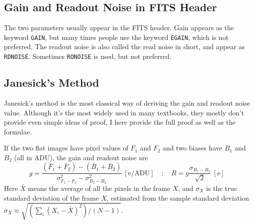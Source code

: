 \subsection{Gain and Readout Noise in FITS Header}
The two parameters usually appear in the FITS header. Gain appears as the keyword \texttt{GAIN}, but many times people use the keyword \texttt{EGAIN}, which is not preferred. The readout noise is also called the read noise in short, and appear as \texttt{RDNOISE}. Sometimes \texttt{RONOISE} is used, but not preferred.

\subsection{Janesick's Method}
Janesick's method is the most classical way of deriving the gain and readout noise value. Although it's the most widely used in many textbooks, they mostly don't provide even simple ideas of proof, I here provide the full proof as well as the formulae.

\begin{thm} \label{thm: janesick method}
If the two flat images have pixel values of $ F_1 $ and $ F_2 $ and two biases have $ B_1 $ and $ B_2 $ (all in ADU), the gain and readout noise are
\begin{equation}\label{eq: janesick method}
  g = \frac{ (\bar{F}_1 + \bar{F}_2) - (\bar{B}_1 + \bar{B}_2)}{\sigma^2_{F_1 - F_2} - \sigma^2_{B_1 - B_2}} ~\mathrm{[e/ADU]}
  \quad;\quad
  R = g\frac{\sigma_{B_1 - B_2}}{\sqrt{2}} ~\mathrm{[e]}
\end{equation}
Here $ \bar{X} $ means the average of all the pixels in the frame $ X $, and $ \sigma_X $ is the true standard deviation of the frame $ X $, estimated from the sample standard deviation $ \sigma_X \approx \sqrt{(\sum_i (X_i - \bar{X})^2) / (N - 1)} $.
\end{thm}

